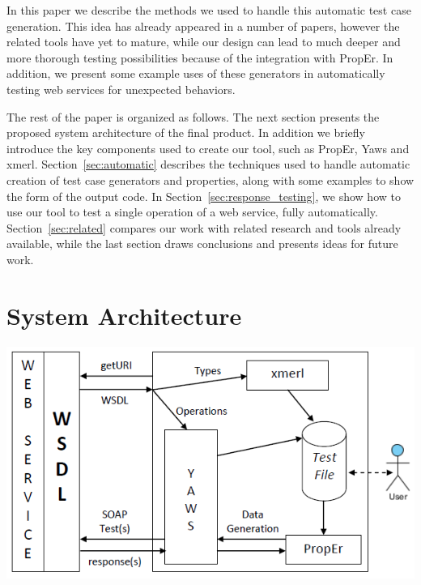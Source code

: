 \documentclass[submission,copyright,a4]{eptcs}
\begin{document}

In this paper we describe the methods we used to handle this automatic
test case generation. This idea has already appeared in a number of papers, 
however the related tools have yet to mature, while our design can lead to much 
deeper and more thorough testing possibilities because of the integration
with PropEr. In addition, we present some example uses of these generators 
in automatically testing web services for unexpected behaviors. 


The rest of the paper is organized as follows.
The next section presents the proposed system architecture of the final 
product. In addition we briefly introduce the key components used to 
create our tool, such as PropEr, Yaws and xmerl.
Section~\ref{sec:automatic} describes the techniques used to handle
automatic creation of test case generators and properties, along with
some examples to show the form of the output code.
In Section~\ref{sec:response_testing}, we show how to use our tool to
test a single operation of a web service, fully automatically.
Section~\ref{sec:related} compares our work with related research and
tools already available, while the last section draws conclusions and
presents ideas for future work.

\section{System Architecture} \label{sec:architecture}

\includegraphics{PropErWebFramework.png}
\end{document}
